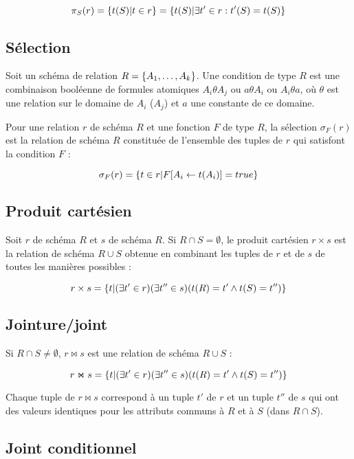 		$$\pi_S(r) = \lbrace t(S) \vert t \in r \rbrace = \lbrace t(S) \vert \exists t' \in r : t'(S) = t(S) \rbrace$$
		
		 \subsection{Sélection}
		 
		 Soit un schéma de relation $R = \lbrace A_1 , \dots , A_k \rbrace$. Une condition de type $R$ est une combinaison booléenne de formules atomiques $A_i \theta A_j$ ou $a \theta A_i$ ou $A_i \theta a$, où $\theta$ est une relation sur le domaine de $A_i$ ($A_j$) et $a$ une constante de ce domaine.
		 
		 Pour une relation $r$ de schéma $R$ et une fonction $F$ de type $R$, la sélection $\sigma_F(r)$ est la relation de schéma $R$ constituée de l'ensemble des tuples de $r$ qui satisfont la condition $F$ :
		 
		 $$\sigma_F(r) = \lbrace  t \in r \vert F[A_i \leftarrow t(A_i)] = true  \rbrace$$
		 
		 \subsection{Produit cartésien}
		 
		 Soit $r$ de schéma $R$ et $s$ de schéma $R$. Si $R \cap S = \emptyset$, le produit cartésien $r \times s$ est la relation de schéma $R \cup S$ obtenue en combinant les tuples de $r$ et de $s$ de toutes les manières possibles :
		 
		 $$r \times s = \lbrace t \vert (\exists t' \in r)(\exists t'' \in s) (t(R) = t'\wedge t(S) = t'') \rbrace$$
		 
		 \subsection{Jointure/joint}
		 
		 Si $R \cap S \neq \emptyset$, $r \Join s$ est une relation de schéma $R \cup S$ :
		 
		 $$r \Join s = \lbrace  t \vert (\exists t' \in r) (\exists t'' \in s ) (t(R) = t' \wedge t(S) = t'')  \rbrace$$
		
		Chaque tuple de $r \Join s$ correspond à un tuple $t'$ de $r$ et un tuple $t''$ de $s$ qui ont des valeurs identiques pour les attributs communs à $R$ et à $S$ (dans $R \cap S$).	
		
		\subsection{Joint conditionnel}
		

